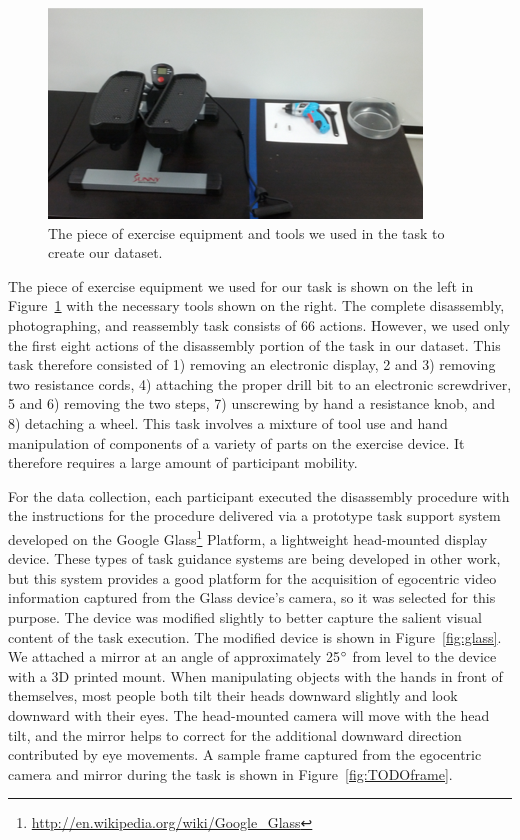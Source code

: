 \documentclass[10pt,twocolumn,letterpaper]{article}
\begin{document}
\begin{figure}[!t]
    \centering
    \includegraphics[width=\columnwidth]{fig/equipment.png}
    \caption{The piece of exercise equipment and tools we used in the task to create our dataset.}
    \label{fig:equipment}
\end{figure}

The piece of exercise equipment we used for our task is shown on the left in Figure~\ref{fig:equipment} with the necessary tools shown on the right. The complete disassembly, photographing, and reassembly task consists of 66 actions. However, we used only the first eight actions of the disassembly portion of the task in our dataset. This task therefore consisted of 1) removing an electronic display, 2 and 3) removing two resistance cords, 4) attaching the proper drill bit to an electronic screwdriver, 5 and 6) removing the two steps, 7) unscrewing by hand a resistance knob, and 8) detaching a wheel. This task involves a mixture of tool use and hand manipulation of components of a variety of parts on the exercise device. It therefore requires a large amount of participant mobility.

For the data collection, each participant executed the disassembly procedure with the instructions for the procedure delivered via a prototype task support system developed on the Google Glass\footnote{\href{http://en.wikipedia.org/wiki/Google_Glass}{http://en.wikipedia.org/wiki/Google\_Glass}} Platform, a lightweight head-mounted display device. These types of task guidance systems are being developed in other work, but this system provides a good platform for the acquisition of egocentric video information captured from the Glass device's camera, so it was selected for this purpose. The device was modified slightly to better capture the salient visual content of the task execution. The modified device is shown in Figure~\ref{fig:glass}. We attached a mirror  at an angle of approximately 25$\degree$ from level to the device with a 3D printed mount. When manipulating objects with the hands in front of themselves, most people both tilt their heads downward slightly and look downward with their eyes. The head-mounted camera will move with the head tilt, and the mirror helps to correct for the additional downward direction contributed by eye movements. A sample frame captured from the egocentric camera and mirror during the task is shown in Figure~\ref{fig:TODOframe}.
\end{document}
